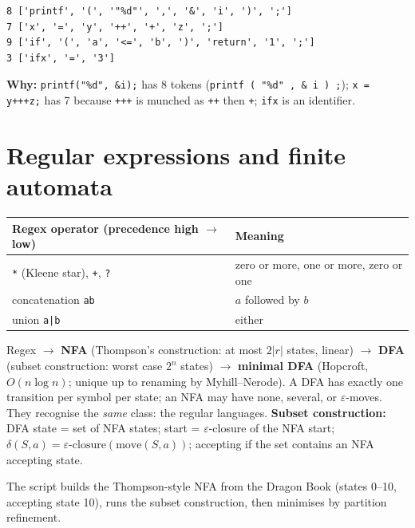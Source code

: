 \documentclass[10pt,a4paper,openany,oneside]{report}
\newcommand{\prio}[1]{\texorpdfstring{\ifcase#1\or{\color{gold}\ding{72}}\or{\color{gold}\ding{72}\ding{72}}\or{\color{gold}\ding{72}\ding{72}\ding{72}}\fi}{}}
\begin{document}
\begin{lstlisting}[style=out,title={Answer: captured output}]
8 ['printf', '(', '"%d"', ',', '&', 'i', ')', ';']
7 ['x', '=', 'y', '++', '+', 'z', ';']
9 ['if', '(', 'a', '<=', 'b', ')', 'return', '1', ';']
3 ['ifx', '=', '3']
\end{lstlisting}
\textbf{Why:} \texttt{printf("\%d", \&i);} has 8 tokens (\texttt{printf ( "\%d" , \& i ) ;}); \texttt{x = y+++z;} has 7 because \texttt{+++} is munched as \texttt{++} then \texttt{+}; \texttt{ifx} is an identifier.

\section{Regular expressions and finite automata \prio{3}}
\begin{center}\small
\begin{xltabular}{\textwidth}{@{}L{4.6cm}Y@{}}
\toprule
\textbf{Regex operator (precedence high $\to$ low)} & \textbf{Meaning}\\
\midrule\endhead
\texttt{*} \;(Kleene star), \texttt{+}, \texttt{?} & zero or more, one or more, zero or one\\
concatenation \texttt{ab} & $a$ followed by $b$\\
union \texttt{a|b} & either\\
\bottomrule
\end{xltabular}
\end{center}
\begin{mustbox}
Regex $\to$ \textbf{NFA} (Thompson's construction: at most $2|r|$ states, linear) $\to$ \textbf{DFA} (subset construction: worst case $2^n$ states) $\to$ \textbf{minimal DFA} (Hopcroft, $O(n\log n)$; unique up to renaming by Myhill--Nerode). A DFA has exactly one transition per symbol per state; an NFA may have none, several, or $\varepsilon$-moves. They recognise the \emph{same} class: the regular languages.
\textbf{Subset construction:} DFA state = set of NFA states; start = $\varepsilon$-closure of the NFA start; $\delta(S,a)=\varepsilon\text{-closure}(\text{move}(S,a))$; accepting if the set contains an NFA accepting state.
\end{mustbox}
\begin{exbox}
The script builds the Thompson-style NFA from the Dragon Book (states 0--10, accepting state 10), runs the subset construction, then minimises by partition refinement.
\end{exbox}
\end{document}
